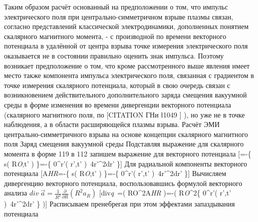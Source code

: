 \documentclass[11pt]{article}
\begin{document}
Таким образом расчёт основанный на предположении о том, что импульс
электрического поля при центрально-симметричном взрыве плазмы связан,
согласно представлений классической электродинамики, дополненных
понятием скалярного магнитного момента, - с производной по времени
векторного потенциала в удалённой от центра взрыва точке измерения
электрического поля оказывается не в состоянии правильно оценить знак
импульса. Поэтому возникает предположение о том, что кроме
рассмотренного выше явления имеет место также компонента импульса
электрического поля, связанная с градиентом в точке измерения скалярного
потенциала, который в свою очередь связан с возникновением
действительного дополнительного заряда смещения вакуумной среды в форме
изменения во времени дивергенции векторного потенциала (скалярного
магнитного поля, по {[}CITATION ГНи \l 1049 {]} ), но уже не в точке
наблюдения, а в области расширяющейся плазмы взрыва. Расчёт ЭМИ
центрально-симметричного взрыва на основе концепции скалярного
магнитного поля Заряд смещения вакуумной среды Подставляя выражение для
скалярного момента в форме 119 в 112 запишем выражение для векторного
потенциала
{[}=-\left\{
s\left( {{R}\emph{{O}},t' \right)
\right\}=-\left\{
\int\limits}{0}^{\infty }{r'\left(
r',t' \right)}~4\pi r{{'}^{2}}dr' \right\}{]} Для радиальной
компоненты векторного потенциала
{[}{{A}\emph{{{{H}}{R}}}}=-\left\{
s\left( {{R}\emph{{O}},t' \right)
\right\}=-\left\{
\int\limits}{0}^{\infty }{r'\left(
r',t' \right)}~4\pi r{{'}^{2}}dr' \right\}{]} Вычисляем
дивергенцию векторного потенциала, воспользовавшись формулой векторного
анализа
\(div\ \overrightarrow{a}=\frac{1}{{{R}^{2}}}\frac{\partial }{\partial R}\left( {{R}^{2}}{{a}_{R}} \right)\)
{[}di{{v}\emph{{q}}~=\left(
{{R}}{O}}^{2}{{A}\emph{{{{H}}{R}}}}
\right)=-\left(
{{R}\emph{{O}}^{2}\left\{
\int\limits}{0}^{\infty }{r'\left(
r',t' \right)}~4\pi r{{'}^{2}}dr' \right\} \right){]}
Расписываем пренебрегая при этом эффектами запаздывания потенциала
\end{document}
